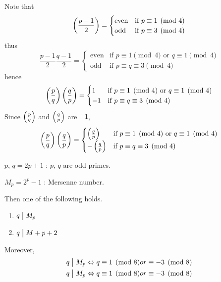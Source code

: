 \begin{remark}
    Note that
    \[
        \left(\frac{p-1}{2}\right) = \begin{cases}
            \mbox{even} & \mbox{if $p\equiv 1 \pmod{4}$} \\
            \mbox{odd} & \mbox{if $p\equiv 3 \pmod{4}$}
        \end{cases}
    \]
    thus
    \[
        \frac{p-1}{2}\frac{q-1}{2} = \begin{cases}
            \mbox{even} & \mbox{if $p\equiv 1 \pmod{4}$ or $q\equiv 1 \pmod{4}$} \\
            \mbox{odd} & \mbox{if $p\equiv q\equiv 3 \pmod{4}$}
        \end{cases}
    \]
    hence 
    \[
        \left(\frac{p}{q}\right)\left(\frac{q}{p}\right) = \begin{cases}
            1 & \mbox{if $p\equiv 1 \pmod{4}$ or $q\equiv 1 \pmod{4}$} \\
            -1 & \mbox{if $p\equiv q\equiv 3 \pmod{4}$}
        \end{cases}
    \]
    Since $\left(\frac{p}{q}\right)$ and $\left(\frac{q}{p}\right)$ are $\pm 1$,
    \[
        \left(\frac{p}{q}\right)\left(\frac{q}{p}\right) = \begin{cases}
            \left(\frac{q}{p}\right) & \mbox{if $p\equiv 1 \pmod{4}$ or $q\equiv 1 \pmod{4}$} \\
            -\left(\frac{q}{p}\right) & \mbox{if $p\equiv q\equiv 3 \pmod{4}$}
        \end{cases}
    \]
\end{remark}

\begin{theorem}
    $p,\,q=2p+1$ : $p$, $q$ are odd primes.

    $M_p=2^p-1$ : Mersenne number.

    Then one of the following holds.
    \begin{enumerate}
        \item $q \bigm| M_p$
        \item $q \bigm| M+p + 2$
    \end{enumerate}

    Moreover,
    \begin{align*}
        q \bigm| M_p & \Leftrightarrow q \equiv 1 \pmod{8} or \equiv -3 \pmod{8} \\
        q \bigm| M_p & \Leftrightarrow q \equiv 1 \pmod{8} or \equiv -3 \pmod{8}
    \end{align*}
\end{theorem}


